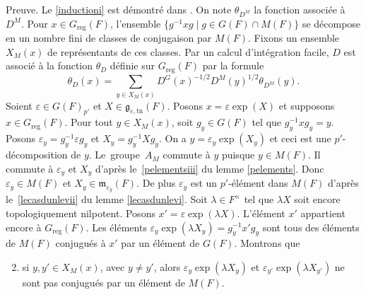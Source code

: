 \documentclass[11pt]{article}
\numberwithin{equation}{section}\providecommand{\og}{«\,}\providecommand{\fg}{\,»}
\let\epsilon\varepsilon
\let\sep\mid
\newcommand{\frg}{\mathfrak{g}}
\newcommand{\mfrm}{\mathfrak{m}}
\newcommand{\reg}{\mathrm{reg}}
\newcommand{\tn}{\mathrm{tn}}
\theoremstyle{plain}
\theoremstyle{definition}
\begin{document}
Preuve. Le \eqref{inductioni} est démontré dans \cite[Lem.\,2.3]{W3}. On note $\theta_{D^M}$ la fonction associée à~$D^M$. Pour $x\in G_{\reg}(F)$, l'ensemble $\{g^{-1}xg\sep g\in G(F)\cap M(F)\}$ se décompose en un nombre fini de classes de conjugaison par $M(F)$. Fixons un ensemble $X_{M}(x)$ de représentants de ces classes. Par un calcul d'intégration facile, $D$ est associé à la fonction $\theta_{D}$ définie sur $G_{\reg}(F)$ par la formule\vspace*{-2pt}\enlargethispage{.5\baselineskip}%
\begin{equation}\tag{1}\label{induction1}
\theta_{D}(x)=\sum_{y\in X_{M}(x)}D^G(x)^{-1/2}D^M(y)^{1/2}\theta_{D^M}(y).
\end{equation}
Soient $\epsilon\in G(F)_{p'}$ et $X\in \frg_{\epsilon,\tn}(F)$. Posons $x=\epsilon \exp(X)$ et supposons $x\in G_{\reg}(F)$. Pour tout $y\in X_{M}(x)$, soit $g_{y}\in G(F)$ tel que $g_{y}^{-1}xg_{y}=y$. Posons $\epsilon_{y}=g_{y}^{-1}\epsilon g_{y}$ et $X_{y}=g_{y}^{-1}X g_{y}$. On a $y=\epsilon_{y}\exp(X_{y})$ et ceci est une $p'$-décomposition de $y$. Le~grou\-pe~$A_{M}$ commute à $y$ puisque $y\in M(F)$. Il commute à $\epsilon_{y}$ et $X_{y}$ d'après le~\eqref{pelementsiii} du lemme \ref{pelements}. Donc $\epsilon_{y}\in M(F)$ et $X_{y}\in \mfrm_{\epsilon_{y}}(F)$. De plus $\epsilon_{y}$ est un $p'$-élément dans $M(F)$ d'après le~\eqref{lecasdunlevii} du lemme \ref{lecasdunlevi}. Soit $\lambda\in F^{\times}$ tel que $\lambda X$ soit encore topologiquement nilpotent. Posons $x'=\epsilon \exp(\lambda X)$. L'élément $x'$ appartient encore à $G_{\reg}(F)$. Les éléments $\epsilon_{y}\exp(\lambda X_{y})=g_{y}^{-1}x'g_{y}$ sont tous des éléments de $M(F)$ conjugués à $x'$ par un élément de $G(F)$. Montrons que
\begin{enumerate}\setcounter{enumi}{1}
\item\label{induction2}
si $y,y'\in X_{M}(x)$, avec $y\neq y'$, alors $\epsilon_{y}\exp(\lambda X_{y})$ et $\epsilon_{y'}\exp(\lambda X_{y'})$ ne sont pas conjugués par un élément de $M(F)$.
\end{enumerate}
\end{document}
